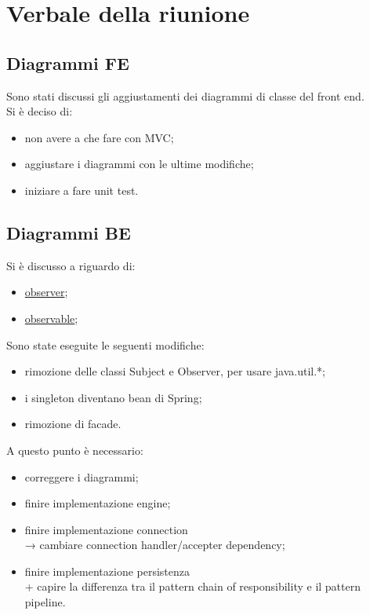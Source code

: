 \section{Verbale della riunione}

\subsection{Diagrammi FE}
Sono stati discussi gli aggiustamenti dei diagrammi di classe del front end.
\\Si è deciso di:
\begin{itemize}
	\item non avere a che fare con MVC;
	\item aggiustare i diagrammi con le ultime modifiche;
	\item iniziare a fare unit test.
\end{itemize}


\subsection{Diagrammi BE}
Si è discusso a riguardo di:
\begin{itemize}
	\item \href{https://docs.oracle.com/javase/8/docs/api/java/util/Observer.html}{observer};
	\item \href{https://docs.oracle.com/javase/8/docs/api/java/util/Observable.html}{observable};
\end{itemize}
Sono state eseguite le seguenti modifiche:
\begin{itemize}
	\item rimozione delle classi Subject e Observer, per usare java.util.*;
	\item i singleton diventano bean di Spring;
	\item rimozione di facade.
\end{itemize}
A questo punto è necessario:
\begin{itemize}
	\item correggere i diagrammi;
	\item finire implementazione engine;
	\item finire implementazione connection \\→ cambiare connection handler/accepter dependency;
	\item finire implementazione persistenza\\+ capire la differenza tra il pattern chain of responsibility e il pattern pipeline.
\end{itemize}

